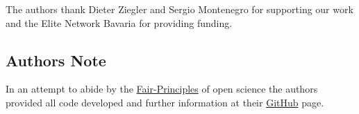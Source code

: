\documentclass[graybox]{svmult}
\newcommand{\1}{\mathbbm{1}}                 %
\begin{document}










\begin{acknowledgement}
The authors thank Dieter Ziegler and Sergio Montenegro for supporting our work and the Elite Network Bavaria for providing funding. 

\subsection*{Authors Note}
In an attempt to abide by the \href{https://www.go-fair.org/fair-principles}{Fair-Principles} of open science the authors provided all code developed and further information at their \href{https://github.com/fallow24/L.U.N.A}{GitHub} page.
\end{acknowledgement}



\end{document}
